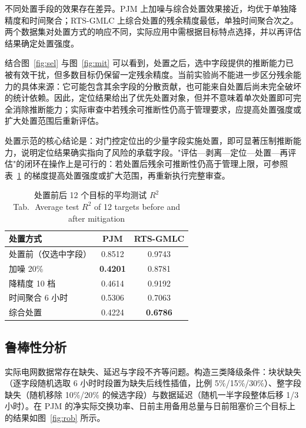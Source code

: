 \documentclass[UTF8,zihao=5,twoside,fontset=none]{ctexart}
\newcommand{\tabbicaption}[2]{\caption{#1\\[-0.2em]\small Tab.\,\thetable\ #2}}
\begin{document}
不同处置手段的效果存在差异。PJM 上加噪与综合处置效果接近，均优于单独降精度和时间聚合；RTS-GMLC 上综合处置的残余精度最低，单独时间聚合次之。两个数据集对处置方式的响应不同，实际应用中需根据目标特点选择，并以再评估结果确定处置强度。

结合图~\ref{fig:sel} 与图~\ref{fig:mit} 可以看到，处置之后，选中字段提供的推断能力已被有效干扰，但多数目标仍保留一定残余精度。当前实验尚不能进一步区分残余能力的具体来源：它可能包含其余字段的分散贡献，也可能来自处置后尚未完全破坏的统计依赖。因此，定位结果给出了优先处置对象，但并不意味着单次处置即可完全消除推断能力；实际审查中若残余可推断性仍高于管理要求，应提高处置强度或扩大处置范围后重新评估。

处置示范的核心结论是：对门控定位出的少量字段实施处置，即可显著压制推断能力，说明定位结果确实指向了风险的承载字段。"评估—剥离—定位—处置—再评估"的闭环在操作上是可行的：若处置后残余可推断性仍高于管理上限，可参照表~\ref{tab:mit} 的梯度提高处置强度或扩大范围，再重新执行完整审查。

\begin{table}[!t]
\centering
\tabbicaption{处置前后 12 个目标的平均测试 $R^2$}{Average test $R^2$ of 12 targets before and after mitigation}
\label{tab:mit}
\setlength{\tabcolsep}{4.0pt}
\begin{tabular}{lcc}
\toprule
处置方式 & PJM & RTS-GMLC \\
\midrule
处置前（仅选中字段） & 0.8512 & 0.9743 \\
\midrule
加噪 20\% & \textbf{0.4201} & 0.8781 \\
降精度 10 档 & 0.4614 & 0.9192 \\
时间聚合 6 小时 & 0.5306 & 0.7063 \\
综合处置 & 0.4224 & \textbf{0.6786} \\
\bottomrule
\end{tabular}
\end{table}

\FloatBarrier

\subsection{鲁棒性分析}

实际电网数据常存在缺失、延迟与字段不齐等问题。构造三类降级条件：块状缺失（逐字段随机选取 6 小时时段置为缺失后线性插值，比例 5\%/15\%/30\%）、整字段缺失（随机移除 10\%/20\% 的候选字段）与数据延迟（随机一半字段整体后移 1/3 小时）。在 PJM 的净实际交换功率、日前主用备用总量与日前阻塞价三个目标上的结果如图~\ref{fig:rob} 所示。
\end{document}
